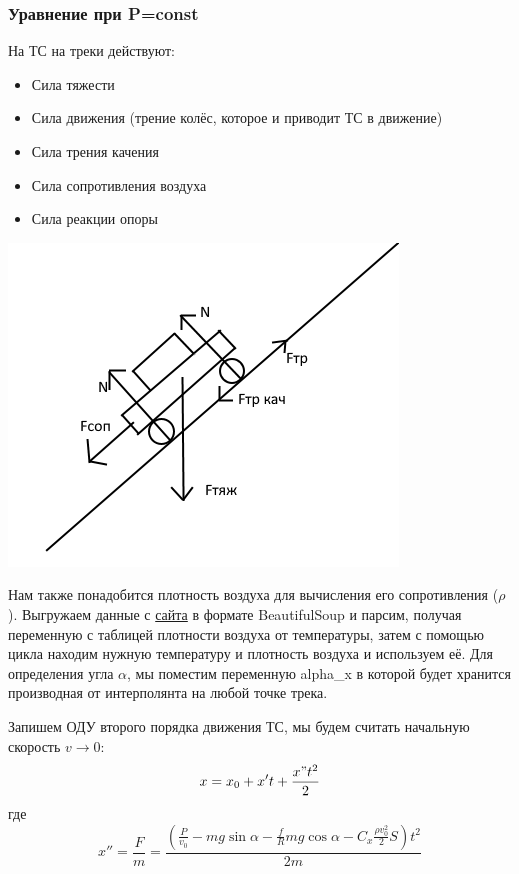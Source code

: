 \documentclass[A4paper,12pt]{article}
\theoremstyle{plain} %
\theoremstyle{definition} %
\theoremstyle{remark} %
\begin{document}
\subsubsection*{Уравнение при P=const}
На ТС на треки действуют:
\begin{itemize}
    \item Сила тяжести
    \item Сила движения (трение колёс, которое и приводит ТС в движение)
    \item Сила трения качения 
    \item Сила сопротивления воздуха
    \item Сила реакции опоры
\end{itemize}

\includegraphics{Зарисовка.png}

 Нам также понадобится плотность воздуха для вычисления его сопротивления ($\rho$). Выгружаем данные с \href{https://ru.wikipedia.org/wiki/Плотность_воздуха}{сайта} в формате BeautifulSoup и парсим, получая переменную с таблицей плотности воздуха от температуры, затем с помощью цикла находим нужную температуру и плотность воздуха и используем её. Для определения угла $\alpha$, мы поместим переменную alpha\_x в которой будет хранится производная от интерполянта на любой точке трека.
 
 Запишем ОДУ второго порядка движения ТС, мы будем считать начальную скорость $v\rightarrow0$:
 \[
 x = x_0 + x't + \dfrac{x"t^2}{2}
 \]
где 
\[
x'' = \dfrac{F}{m} =  \dfrac{(\frac{P}{v_0}-mg\sin{\alpha} - \frac{f}{R}mg\cos{\alpha} - C_x\frac{\rho v_0^2}{2}S)t^2}{2m}
\]
\end{document}
